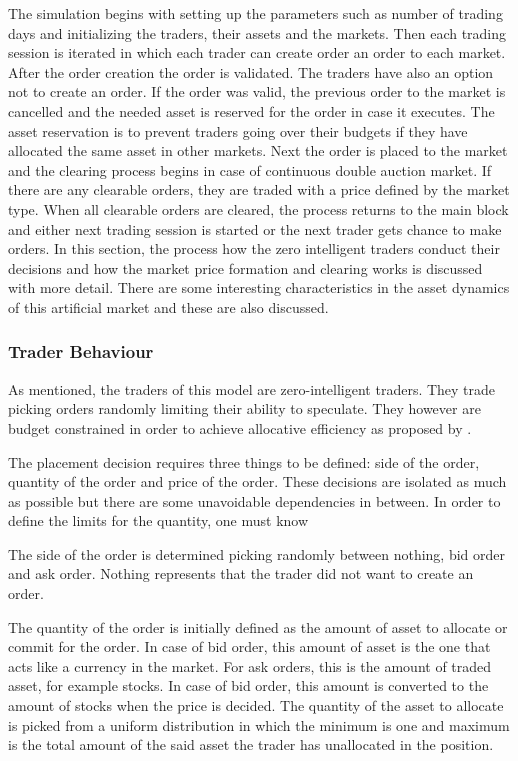 The simulation begins with setting up the parameters such as number of
trading days and initializing the traders, their assets and the markets.
Then each trading session is iterated in which each trader can create order 
an order to each market. After the order creation the order is validated.
The traders have also an option not to create an order. If the order was
valid, the previous order to the market is cancelled and the needed 
asset is reserved for the order in case it executes. The asset
reservation is to prevent traders going over their budgets if they
have allocated the same asset in other markets. Next the order is
placed to the market and the clearing process begins in case of 
continuous double auction market. If there are any clearable orders,
they are traded with a price defined by the market type. When
all clearable orders are cleared, the process returns to the
main block and either next trading session is started or the next
trader gets chance to make orders. In this section, the process how the
zero intelligent traders conduct their decisions and how the 
market price formation and clearing works is discussed with more detail.
There are some interesting characteristics in the asset dynamics of this
artificial market and these are also discussed.

\subsubsection{Trader Behaviour}

As mentioned, the traders of this model are zero-intelligent
traders. They trade picking orders randomly limiting their
ability to speculate. They however are budget constrained
in order to achieve allocative efficiency as proposed by
\citet{God93}.

The placement decision requires three things to be defined: 
side of the order, quantity of the order and price of the order. 
These decisions are isolated as much as possible but there 
are some unavoidable dependencies in between. In order to
define the limits for the quantity, one must know 

The side of the order is determined picking randomly
between nothing, bid order and ask order. Nothing
represents that the trader did not want to create 
an order.

The quantity of the order is initially defined as the
amount of asset to allocate or commit for the order. 
In case of bid order, this amount of asset is the one that acts
like a currency in the market. For ask orders, this 
is the amount of traded asset, for example stocks. In 
case of bid order, this amount is converted to the 
amount of stocks when the price is decided. The quantity
of the asset to allocate is picked from a uniform distribution
in which the minimum is one and maximum is the total 
amount of the said asset the trader has unallocated in the
position. 

